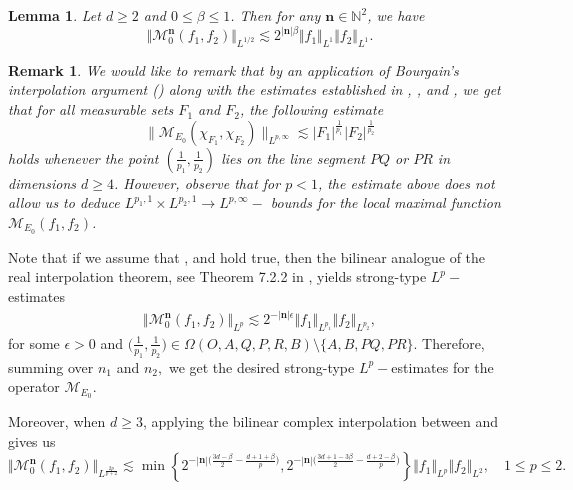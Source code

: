 \documentclass[a4paper,reqno]{amsart}
\newtheorem{lemma}{Lemma}[section]
\newtheorem{remark}[thm]{Remark}
\newcounter{old}
\numberwithin{equation}{section}
\newcommand{\N}{{\mathbb N}}
\begin{document}
	\begin{lemma}\label{l1}
		Let $d\geq2$ and $0\leq \beta\leq1$. Then for any $\mathbf{n}\in\N^2$, we have
		\begin{equation*}
			\Vert  \mathcal{M}^{\mathbf{n}}_0(f_1,f_2)\Vert_{L^{1/2}}\lesssim 2^{|\mathbf{n}|\beta}\Vert f_1\Vert_{L^1}\Vert f_2\Vert_{L^1}.
		\end{equation*}
	\end{lemma}
	\begin{remark}
		We would like to remark that by an application of Bourgain's interpolation argument \big(\cite[Lemma 2.6]{Lee1}\big) along with the estimates established in , , and , we get that for all measurable sets $F_1$ and $F_2$, the following estimate 
		\[\|\mathcal{M}_{E_0}(\chi_{F_1},\chi_{F_2})\|_{L^{p,\infty}} \lesssim |F_1|^{\frac{1}{p_1}}|F_2|^{\frac{1}{p_2}}\]
		holds whenever the point $(\frac{1}{p_1}, \frac{1}{p_2})$ lies on the line segment $PQ$ or $PR$ in dimensions $d \geq 4$. However, observe that for $p<1$, the estimate above does not allow us to deduce $L^{p_1,1}\times L^{p_2,1}\to L^{p,\infty}-$ bounds for the local maximal function $\mathcal{M}_{E_0}(f_1,f_2)$.
	\end{remark}
	Note that if we assume that ,  and  hold true, then the bilinear analogue of the real interpolation theorem, see Theorem 7.2.2 in \cite{modernGrafakos}, yields strong-type $L^p-$estimates 
	\begin{align*}
		\Vert \mathcal{M}^{\mathbf{n}}_0(f_1,f_2)\Vert_{L^p}\lesssim 2^{-|\mathbf{n}|\epsilon}\Vert f_1\Vert_{L^{p_1}}\Vert f_2\Vert_{L^{p_2}},
	\end{align*}
	for some $\epsilon>0$ and $\big(\frac{1}{p_1},\frac{1}{p_2}\big)\in\Omega(O,A,Q,P,R,B)\setminus \{A,B,PQ,PR\}$. Therefore, summing over $n_1$ and $n_2,$ we get the desired strong-type $L^p-$estimates for the operator $\mathcal{M}_{E_0}$.
	
	\iffalse 
	Moreover, when $d\geq3$, applying the bilinear complex interpolation between  and  gives us
	\begin{equation}\label{forinterpolation}
		\Vert \mathcal{M}^{\mathbf{n}}_0(f_1,f_2)\Vert_{L^{\frac{2p}{p+2}}}\lesssim \min\left\{2^{-|\mathbf{n}|\big(\frac{3d-\beta}{2}-\frac{d+1+\beta}{p}\big)},2^{-|\mathbf{n}|\big(\frac{3d+1-3\beta}{2}-\frac{d+2-\beta}{p}\big)}\right\}\Vert f_1\Vert_{L^{p}}\Vert f_2\Vert_{L^{2}},\quad 1\leq p\leq2.
	\end{equation}
	
\end{document}
